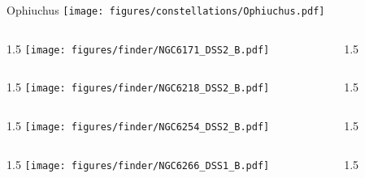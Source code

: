 \documentclass[final]{beamer}
\newlength{\colwidth}
\begin{document}

\begin{frame}[t]{\LARGE Ophiuchus}
    \centering
    \texttt{[image: figures/constellations/Ophiuchus.pdf]}
\end{frame}


\begin{frame}[t]{}
    \begin{columns}[T]
        \begin{column}{1.5\colwidth}
            \centering
            \texttt{[image: figures/finder/NGC6171\_DSS2\_B.pdf]}
        \end{column}
        \begin{column}{1.5\colwidth}
            \Large
            
        \end{column}
    \end{columns}
    \vspace{\fill}
    \begin{columns}[T]
        \begin{column}{1.5\colwidth}
            \centering
            \texttt{[image: figures/finder/NGC6218\_DSS2\_B.pdf]}
        \end{column}
        \begin{column}{1.5\colwidth}
            \Large
            
        \end{column}
    \end{columns}
\end{frame}


\begin{frame}[t]{}
    \begin{columns}[T]
        \begin{column}{1.5\colwidth}
            \centering
            \texttt{[image: figures/finder/NGC6254\_DSS2\_B.pdf]}
        \end{column}
        \begin{column}{1.5\colwidth}
            \Large
            
        \end{column}
    \end{columns}
    \vspace{\fill}
    \begin{columns}[T]
        \begin{column}{1.5\colwidth}
            \centering
            \texttt{[image: figures/finder/NGC6266\_DSS1\_B.pdf]}
        \end{column}
        \begin{column}{1.5\colwidth}
            \Large
            
        \end{column}
    \end{columns}
\end{frame}
\end{document}
